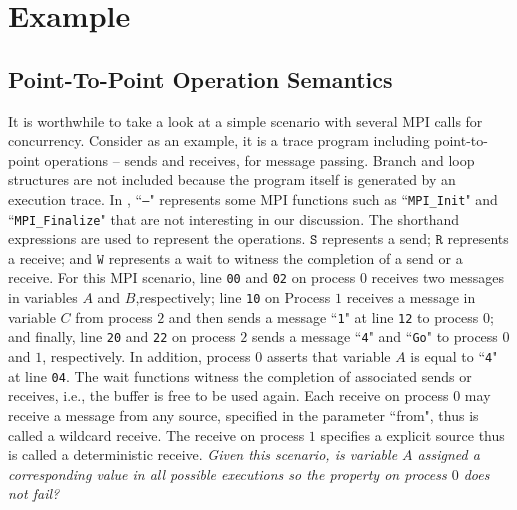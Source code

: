 \section{Example}\label{sec:example}
\subsection{Point-To-Point Operation Semantics}
It is worthwhile to take a look at a simple scenario with several MPI calls for concurrency. Consider  as an example, it is a trace program including point-to-point operations -- sends and receives, for message passing. Branch and loop structures are not included because the program itself is generated by an execution trace.
In , ``\texttt{---}" represents some MPI functions such as ``\texttt{MPI\_Init}" and ``\texttt{MPI\_Finalize}" that are not interesting in our discussion. The shorthand expressions are used to represent the operations. $\mathtt{S}$ represents a send; $\mathtt{R}$ represents a receive; and $\mathtt{W}$ represents a wait to witness the completion of a send or a receive. For this MPI scenario, line \texttt{00} and \texttt{02} on process $0$ receives two messages in variables $A$ and $B$,respectively; line \texttt{10} on Process $1$ receives a message in variable $C$ from process $2$ and then sends a message ``\texttt{1}" at line \texttt{12} to process $0$; and finally, line \texttt{20} and \texttt{22} on process $2$ sends a message ``\texttt{4}" and ``\texttt{Go}" to process $0$ and $1$, respectively. In addition, process $0$ asserts that variable $A$ is equal to ``\texttt{4}" at line \texttt{04}. The wait functions witness the completion of associated sends or receives, i.e., the buffer is free to be used again. Each receive on process $0$ may receive a message from any source, specified in the parameter ``from", thus is called a wildcard receive. The receive on process $1$ specifies a explicit source thus is called a deterministic receive. \textit{Given this scenario, is variable $A$ assigned a corresponding value in all possible executions so the property on process $0$ does not fail?}

